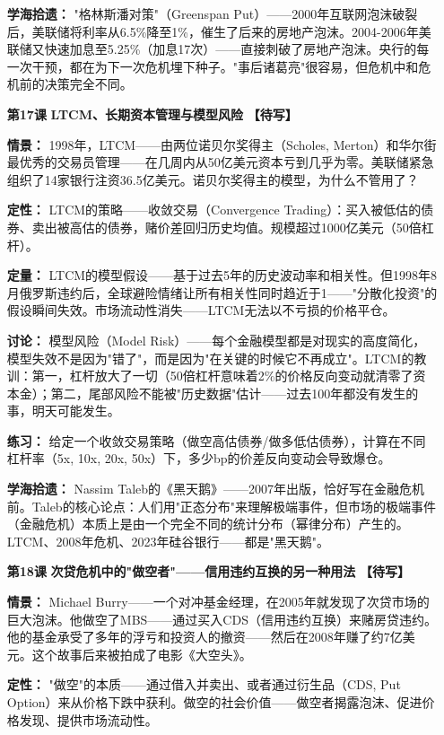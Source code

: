 \documentclass[a4paper,11pt]{ctexart}
\newcommand{\draft}{\textcolor{orange!80!black}{\textbf{【待写】}}}
\begin{document}
\begin{enumerate}
\textbf{学海拾遗：} "格林斯潘对策"（Greenspan Put）——2000年互联网泡沫破裂后，美联储将利率从6.5\%降至1\%，催生了后来的房地产泡沫。2004-2006年美联储又快速加息至5.25\%（加息17次）——直接刺破了房地产泡沫。央行的每一次干预，都在为下一次危机埋下种子。"事后诸葛亮"很容易，但危机中和危机前的决策完全不同。

\item[\textbf{第17课}] \textbf{LTCM、长期资本管理与模型风险} \draft

\textbf{情景：} 1998年，LTCM——由两位诺贝尔奖得主（Scholes, Merton）和华尔街最优秀的交易员管理——在几周内从50亿美元资本亏到几乎为零。美联储紧急组织了14家银行注资36.5亿美元。诺贝尔奖得主的模型，为什么不管用了？

\textbf{定性：} LTCM的策略——收敛交易（Convergence Trading）：买入被低估的债券、卖出被高估的债券，赌价差回归历史均值。规模超过1000亿美元（50倍杠杆）。

\textbf{定量：} LTCM的模型假设——基于过去5年的历史波动率和相关性。但1998年8月俄罗斯违约后，全球避险情绪让所有相关性同时趋近于1——"分散化投资"的假设瞬间失效。市场流动性消失——LTCM无法以不亏损的价格平仓。

\textbf{讨论：} 模型风险（Model Risk）——每个金融模型都是对现实的高度简化，模型失效不是因为"错了"，而是因为"在关键的时候它不再成立"。LTCM的教训：第一，杠杆放大了一切（50倍杠杆意味着2\%的价格反向变动就清零了资本金）；第二，尾部风险不能被"历史数据"估计——过去100年都没有发生的事，明天可能发生。

\textbf{练习：} 给定一个收敛交易策略（做空高估债券/做多低估债券），计算在不同杠杆率（5x, 10x, 20x, 50x）下，多少bp的价差反向变动会导致爆仓。

\textbf{学海拾遗：} Nassim Taleb的《黑天鹅》——2007年出版，恰好写在金融危机前。Taleb的核心论点：人们用"正态分布"来理解极端事件，但市场的极端事件（金融危机）本质上是由一个完全不同的统计分布（幂律分布）产生的。LTCM、2008年危机、2023年硅谷银行——都是"黑天鹅"。

\item[\textbf{第18课}] \textbf{次贷危机中的"做空者"——信用违约互换的另一种用法} \draft

\textbf{情景：} Michael Burry——一个对冲基金经理，在2005年就发现了次贷市场的巨大泡沫。他做空了MBS——通过买入CDS（信用违约互换）来赌房贷违约。他的基金承受了多年的浮亏和投资人的撤资——然后在2008年赚了约7亿美元。这个故事后来被拍成了电影《大空头》。

\textbf{定性：} "做空"的本质——通过借入并卖出、或者通过衍生品（CDS, Put Option）来从价格下跌中获利。做空的社会价值——做空者揭露泡沫、促进价格发现、提供市场流动性。


\end{enumerate}
\end{document}
